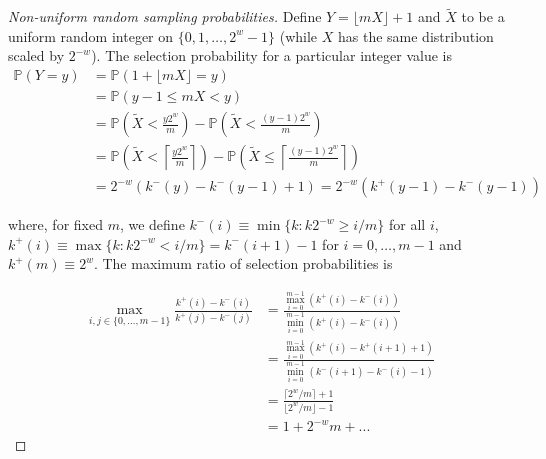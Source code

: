 \documentclass{beamer}
\newcommand{\pr}{\mathbb{P}} %
\begin{document}
\begin{frame}[label = nonuniform-proof]
\tiny
\begin{proof}[Non-uniform random sampling probabilities]
Define $Y = \lfloor mX \rfloor + 1$ and $\tilde{X}$ to be a uniform random integer on $\{0, 1, \dots, 2^w - 1\}$ (while $X$ has the same distribution scaled by $2^{-w}$).
The selection probability for a particular integer value is 
\begin{align*}
\pr\left(Y = y\right) &= \pr\left(1 + \lfloor mX \rfloor = y\right) \\
&= \pr\left(y-1 \leq mX < y\right) \\
&= \pr\left(\tilde{X} < \frac{y2^w}{m}\right) - \pr\left(\tilde{X} < \frac{(y-1)2^w}{m}\right)\\
&= \pr\left(\tilde{X} < \left\lceil\frac{y2^w}{m}\right\rceil\right) - \pr\left(\tilde{X} \leq \left\lceil\frac{(y-1)2^w}{m}\right\rceil\right)\\
&= 2^{-w}\left(k^-(y)- k^-(y-1) + 1\right) = 2^{-w}\left(k^+(y-1)- k^-(y-1) \right)
\end{align*}

\noindent where, for fixed $m$, we define $k^-(i) \equiv \min \{k: k2^{-w} \geq i/m\}$ for all $i$,
$k^+(i) \equiv \max \{k : k2^{-w} < i/m \} = k^-(i+1)-1$ for $i = 0, \dots, m-1$
and $k^+(m) \equiv 2^w$.
The maximum ratio of selection probabilities is 

\begin{align*}
\max_{i, j \in \{0, \ldots, m-1\}} \frac{k^+(i) - k^-(i)}{k^+(j) - k^-(j)}
&= \frac{ \max_{i=0}^{m-1} (k^+(i) - k^-(i))}{\min_{i=0}^{m-1} (k^+(i) - k^-(i))} \\
&= \frac{ \max_{i=0}^{m-1} (k^+(i) - k^+(i+1) + 1)}{\min_{i=0}^{m-1} (k^-(i+1) - k^-(i) -1)} \\
&= \frac{\lceil 2^w/m \rceil + 1}{\lfloor 2^w/m \rfloor - 1} \\
&= 1 + 2^{-w}m + ...
\end{align*}

\end{proof}
\hyperlink{nonuniform-lemma}{}

\end{frame}
\end{document}
